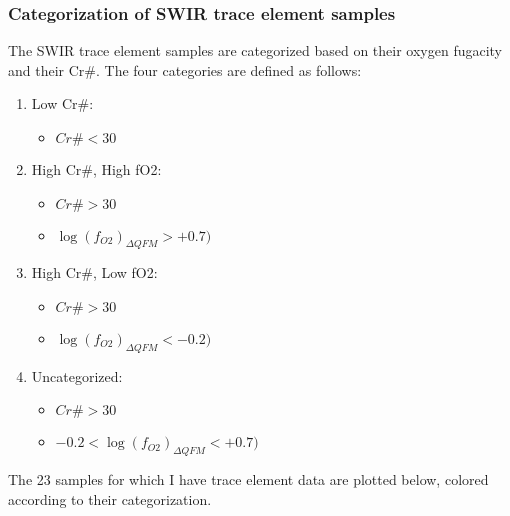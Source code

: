 \documentclass[11pt]{article}
\providecommand{\tightlist}{%
      \setlength{\itemsep}{0pt}\setlength{\parskip}{0pt}}
\begin{document}
    \hypertarget{categorization-of-swir-trace-element-samples}{%
\subsubsection{Categorization of SWIR trace element
samples}\label{categorization-of-swir-trace-element-samples}}

    The SWIR trace element samples are categorized based on their oxygen
fugacity and their Cr\#. The four categories are defined as follows:

\begin{enumerate}
\def\labelenumi{\arabic{enumi}.}
\tightlist
\item
  Low Cr\#:

  \begin{itemize}
  \tightlist
  \item
    \(Cr\# < 30\)
  \end{itemize}
\item
  High Cr\#, High fO2:

  \begin{itemize}
  \tightlist
  \item
    \(Cr\# > 30\)
  \item
    \(\log(f_{O2})_{\Delta QFM} > +0.7)\)
  \end{itemize}
\item
  High Cr\#, Low fO2:

  \begin{itemize}
  \tightlist
  \item
    \(Cr\# > 30\)\\
  \item
    \(\log(f_{O2})_{\Delta QFM} < -0.2)\)
  \end{itemize}
\item
  Uncategorized:

  \begin{itemize}
  \tightlist
  \item
    \(Cr\# > 30\)
  \item
    \(-0.2 < \log(f_{O2})_{\Delta QFM} < +0.7)\)
  \end{itemize}
\end{enumerate}

The 23 samples for which I have trace element data are plotted below,
colored according to their categorization.
\end{document}
